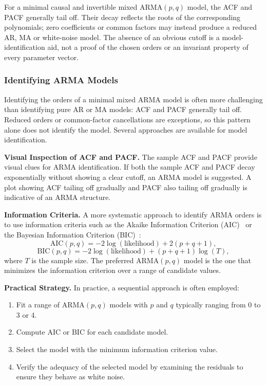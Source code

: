 For a minimal causal and invertible mixed ARMA$(p,q)$ model,
the ACF and PACF generally tail off. Their decay reflects the roots
of the corresponding polynomials; zero coefficients or common factors
may instead produce a reduced AR, MA or white-noise model. The absence
of an obvious cutoff is a model-identification aid, not a proof of the
chosen orders or an invariant property of every parameter vector.
\subsubsection{Identifying ARMA Models}
Identifying the orders of a minimal mixed ARMA model is often more
challenging than identifying pure AR or MA models: ACF and PACF
generally tail off. Reduced orders or common-factor cancellations are
exceptions, so this pattern alone does not identify the model. Several
approaches are available for model identification.

\textbf{Visual Inspection of ACF and PACF.}
The sample ACF and PACF provide visual clues for ARMA identification. If both the sample ACF and PACF decay exponentially without showing a clear cutoff, an ARMA model is suggested. A plot showing ACF tailing off gradually and PACF also tailing off gradually is indicative of an ARMA structure.

\textbf{Information Criteria.}
A more systematic approach to identify ARMA orders is to use information criteria such as the Akaike Information Criterion (AIC)~\cite{Akaike1974} or the Bayesian Information Criterion (BIC)~\cite{Schwarz1978}:
\[
\text{AIC}(p,q) = -2\log(\text{likelihood}) + 2(p + q + 1),
\]
\[
\text{BIC}(p,q) = -2\log(\text{likelihood}) + (p + q + 1)\log(T),
\]
where $T$ is the sample size. The preferred ARMA$(p,q)$ model is the one that minimizes the information criterion over a range of candidate values.

\textbf{Practical Strategy.}
In practice, a sequential approach is often employed:
\begin{enumerate}
    \item Fit a range of ARMA$(p,q)$ models with $p$ and $q$ typically ranging from 0 to 3 or 4.
    \item Compute AIC or BIC for each candidate model.
    \item Select the model with the minimum information criterion value.
    \item Verify the adequacy of the selected model by examining the residuals to ensure they behave as white noise.
\end{enumerate}

